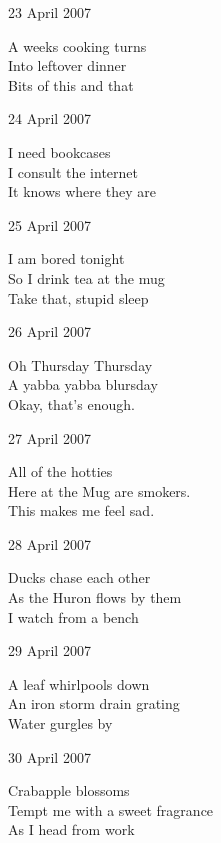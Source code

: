 \documentclass[12pt]{article}
\begin{document}
23 April 2007

A weeks cooking turns \\
Into leftover dinner \\
Bits of this and that

24 April 2007

I need bookcases \\
I consult the internet \\
It knows where they are

25 April 2007

I am bored tonight \\
So I drink tea at the mug \\
Take that, stupid sleep


\newpage

26 April 2007

Oh Thursday Thursday \\
A yabba yabba blursday \\
Okay, that's enough.

27 April 2007

All of the hotties \\
Here at the Mug are smokers. \\
This makes me feel sad.

28 April 2007

Ducks chase each other \\
As the Huron flows by them \\
I watch from a bench

29 April 2007

A leaf whirlpools down \\
An iron storm drain grating \\
Water gurgles by

30 April 2007

Crabapple blossoms \\
Tempt me with a sweet fragrance \\
As I head from work

\newpage
\end{document}
